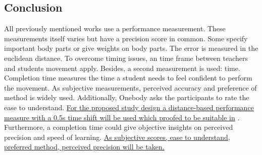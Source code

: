 \subsection{Conclusion}
All previously mentioned works use a performance measurement. These measurements itself varies but have a precision score in common. Some \cite{Anderson2013a}\cite{Chan2010}\cite{Tang2015}\cite{Sodhi2012} specify important body parts or give weights on body parts. The error is measured in the euclidean distance. To overcome timing issues, an time frame between teachers and students movement apply. Besides, a second measurement is used: time. Completion time measures the time a student needs to feel confident to perform the movement. As subjective measurements, perceived accuracy and preference of method is widely used. Additionally, Onebody asks the participants to rate the ease to understand. \ul{For the proposed study design a distance-based performance measure with a 0.5s time shift will be used which proofed to be suitable in} \cite{Anderson2013a}. Furthermore, a completion time could give objective insights on perceived precision and speed of learning. \ul{As subjective scores, ease to understand, preferred method, perceived precision will be taken.}

